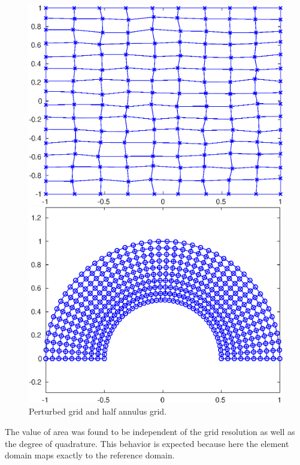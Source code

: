 \documentclass{article}
\begin{document}
\begin{figure}[H]
  \centering
  \begin{minipage}{.4\textwidth}
    \centering
  \includegraphics[width=\linewidth]{media/5-2-grid.eps}
  \end{minipage}%
  \begin{minipage}{.4\textwidth}
    \centering
  \includegraphics[width=\linewidth]{media/5-3-grid.eps}
  \end{minipage}%
  \caption{Perturbed grid and half annulus grid.}
\end{figure}

The value of area was found to be independent of the grid resolution as well as the degree of quadrature. This behavior is expected because here the element domain maps exactly to the reference domain.
\end{document}
